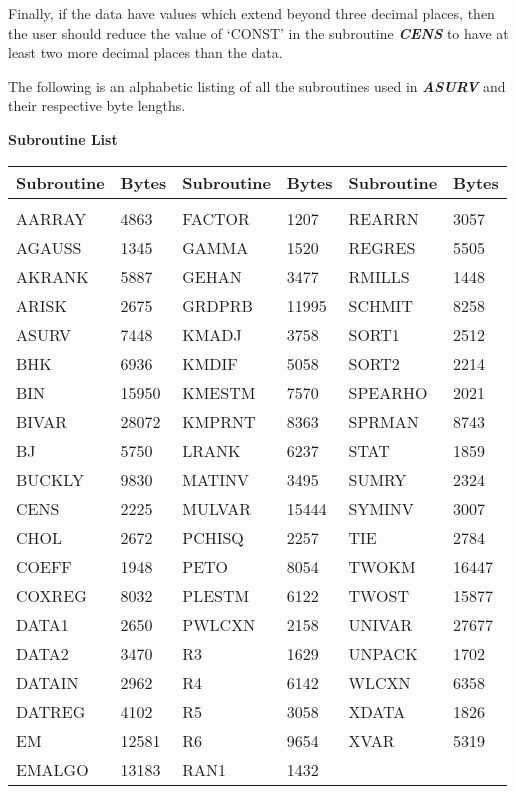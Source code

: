      Finally, if the data have values which extend beyond three decimal places,
then the user should reduce the value of `CONST' in the subroutine 
{\sl\bf CENS} to have at least two more decimal places than the data.


\newpage
{}

     The following is an alphabetic listing of all the subroutines 
used in {\sl\bf ASURV} and their respective byte lengths.


\bigskip
\bigskip
\centerline{\large\bf Subroutine List}

\bigskip
\begin{center}
\begin{tabular}{|ll|ll|ll|} \hline
   Subroutine & Bytes & Subroutine & Bytes & Subroutine & Bytes  \\ \hline
&&&&& \\
                AARRAY &4863 & FACTOR &1207 & REARRN & 3057 \\
                AGAUSS &1345 & GAMMA &1520 & REGRES & 5505 \\
                AKRANK &5887 & GEHAN &3477 & RMILLS & 1448 \\
                ARISK &2675 & GRDPRB &11995 & SCHMIT & 8258\\
                ASURV &7448 & KMADJ &3758 & SORT1 & 2512\\
                BHK &6936 & KMDIF &5058 & SORT2 & 2214\\
                BIN &15950 & KMESTM &7570 & SPEARHO & 2021\\
                BIVAR &28072 & KMPRNT &8363 & SPRMAN & 8743\\
                BJ &5750 & LRANK &6237 & STAT & 1859\\
                BUCKLY &9830 & MATINV &3495 & SUMRY & 2324\\
                CENS &2225 & MULVAR &15444 & SYMINV & 3007\\
                CHOL &2672 & PCHISQ &2257 & TIE & 2784\\
                COEFF &1948 & PETO &8054 & TWOKM & 16447\\
                COXREG &8032 & PLESTM &6122 & TWOST & 15877\\
                DATA1 &2650 & PWLCXN &2158 & UNIVAR & 27677\\
                DATA2 &3470 & R3 &1629 & UNPACK & 1702\\
                DATAIN &2962 & R4 &6142 & WLCXN & 6358\\
                DATREG &4102 & R5 &3058 & XDATA & 1826\\
                EM &12581 & R6 &9654 & XVAR & 5319\\
                EMALGO &13183 & RAN1 &1432 & &\\ \hline
\end{tabular}
\end{center}

